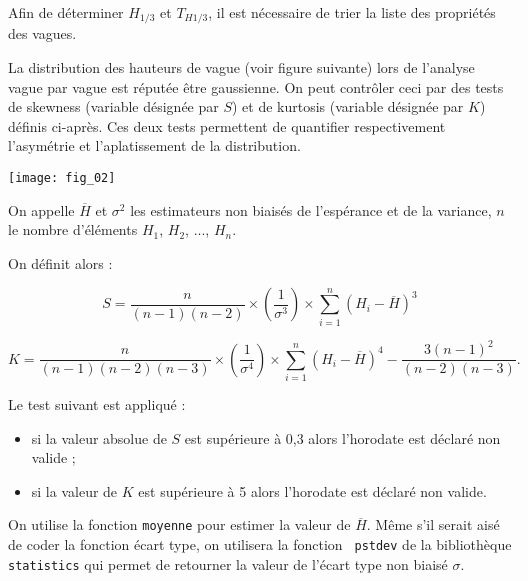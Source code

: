 Afin de déterminer $H_{1/3}$ et $T_{H1/3}$, il est nécessaire de trier la liste des propriétés des vagues. 




La distribution des hauteurs de vague (voir figure suivante) lors de l’analyse vague par vague est
réputée être gaussienne. On peut contrôler ceci par des tests de skewness (variable désignée par $S$)
et de kurtosis (variable désignée par $K$) définis ci-après. Ces deux tests permettent de quantifier
respectivement l’asymétrie et l’aplatissement de la distribution.

\begin{center}
\texttt{[image: fig\_02]}
\end{center}


On appelle $\overline{H}$ et $\sigma^2$ les estimateurs non biaisés de l'espérance et de la variance, $n$ le nombre d'éléments $H_1$, $H_2$, ..., $H_n$.

On définit alors :

$$ S = \dfrac{n}{\left(n-1 \right)\left(n-2 \right)}\times \left( \dfrac{1}{\sigma^3}\right)\times \sum\limits_{i=1}^{n} \left(H_i - \overline{H} \right)^3
$$

$$ K = \dfrac{n}{\left(n-1 \right)\left(n-2 \right)\left(n-3 \right)}\times \left( \dfrac{1}{\sigma^4}\right)\times \sum\limits_{i=1}^{n} \left(H_i - \overline{H} \right)^4
-\dfrac{3\left(n-1 \right)^2}{\left(n-2 \right)\left(n-3 \right)}.
$$


Le test suivant est appliqué :
\begin{itemize}
\item si la valeur absolue de $S$ est supérieure à 0,3 alors l’horodate est déclaré non valide ;
\item si la valeur de $K$ est supérieure à 5 alors l’horodate est déclaré non valide.
\end{itemize}
On utilise la fonction \texttt{moyenne} pour estimer la valeur de $\overline{H}$. 
Même s'il serait aisé de coder la fonction écart type, on utilisera la fonction \texttt{
pstdev} de la bibliothèque \texttt{statistics} qui permet de retourner la valeur de l’écart type non biaisé $\sigma$.



